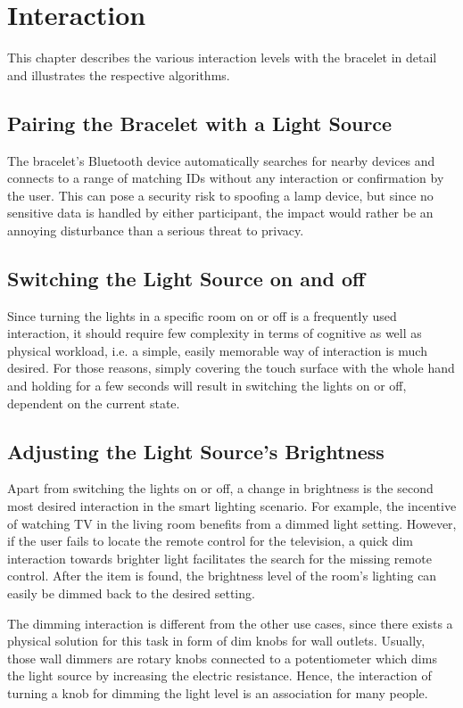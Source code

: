 \chapter{Interaction}
This chapter describes the various interaction levels with the bracelet in detail and illustrates the respective algorithms.

\section{Pairing the Bracelet with a Light Source}
The bracelet's Bluetooth device automatically searches for nearby devices and connects to a range of matching IDs without any interaction or confirmation by the user. This can pose a security risk to spoofing a lamp device, but since no sensitive data is handled by either participant, the impact would rather be an annoying disturbance than a serious threat to privacy.

\section{Switching the Light Source on and off}
Since turning the lights in a specific room on or off is a frequently used interaction, it should require few complexity in terms of cognitive as well as physical workload, i.e. a simple, easily memorable way of interaction is much desired. For those reasons, simply covering the touch surface with the whole hand and holding for a few seconds will result in switching the lights on or off, dependent on the current state.

\section{Adjusting the Light Source's Brightness}
Apart from switching the lights on or off, a change in brightness is the second most desired interaction in the smart lighting scenario. For example, the incentive of watching TV in the living room benefits from a dimmed light setting. However, if the user fails to locate the remote control for the television, a quick dim interaction towards brighter light facilitates the search for the missing remote control. After the item is found, the brightness level of the room's lighting can easily be dimmed back to the desired setting.

The dimming interaction is different from the other use cases, since there exists a physical solution for this task in form of dim knobs for wall outlets. Usually, those wall dimmers are rotary knobs connected to a potentiometer which dims the light source by increasing the electric resistance. Hence, the interaction of turning a knob for dimming the light level is an association for many people.


